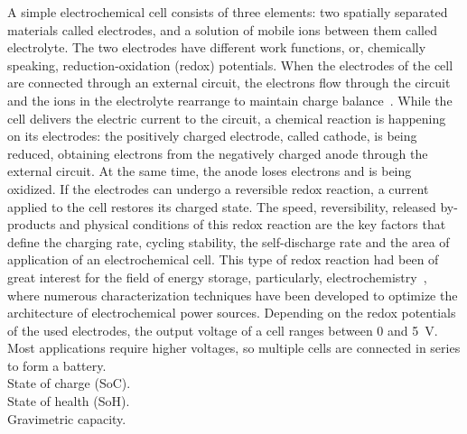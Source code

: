 A simple electrochemical cell consists of three elements: two spatially separated materials called electrodes, and a solution of mobile ions between them called electrolyte. The two electrodes have different work functions, or, chemically speaking, reduction-oxidation (redox) potentials. When the electrodes of the cell are connected through an external circuit, the electrons flow through the circuit and the ions in the electrolyte rearrange to maintain charge balance~\cite{muench2016_chemrev}. While the cell delivers the electric current to the circuit, a chemical reaction is happening on its electrodes: the positively charged electrode, called cathode, is being reduced, obtaining electrons from the negatively charged anode through the external circuit. At the same time, the anode loses electrons and is being oxidized. If the electrodes can undergo a reversible redox reaction, a current applied to the cell restores its charged state. The speed, reversibility, released by-products and physical conditions of this redox reaction are the key factors that define the charging rate, cycling stability, the self-discharge rate and the area of application of an electrochemical cell. This type of redox reaction had been of great interest for the field of energy storage, particularly, electrochemistry~\cite{echem_book}, where numerous characterization techniques have been developed to optimize the architecture of electrochemical power sources. Depending on the redox potentials of the used electrodes, the output voltage of a cell ranges between 0 and 5~V. Most applications require higher voltages, so multiple cells are connected in series to form a battery.\\



State of charge (SoC).\\
State of health (SoH).\\
Gravimetric capacity.\\


